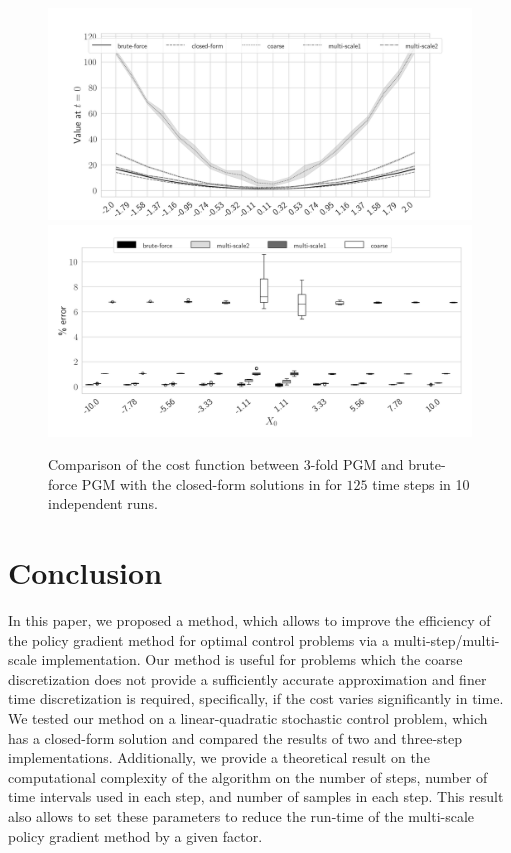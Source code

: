 \documentclass{article}
\numberwithin{equation}{section}
\begin{document}
\begin{figure}[ht!]
    \centering
    \includegraphics[width=1\linewidth]{figures/bf_100_50_5_8.png}
    \includegraphics[width=.9\linewidth]{figures/rel_100_50_5_Comparison_bf_ms2_coarse_7.png}
    \caption{Comparison of the cost function between $3$-fold PGM and brute-force PGM with the closed-form solutions in for $125$ time steps in 10 independent runs.}
    \label{fig:value2_comparison_bw_brute_multi}
\end{figure}
\section{Conclusion}
In this paper, we proposed a method, which allows to improve the efficiency of the policy gradient method for optimal control problems via a multi-step/multi-scale implementation. Our method is useful for problems which the coarse discretization does not provide a sufficiently accurate approximation and finer time discretization is required, specifically, if the cost varies significantly in time. We tested our method on a linear-quadratic stochastic control problem, which has a closed-form solution and compared the results of two and three-step implementations. Additionally, we provide a theoretical result on the computational complexity of the algorithm on the number of steps, number of time intervals used in each step, and number of samples in each step. This result also allows to set these parameters to reduce the run-time of the multi-scale policy gradient method by a given factor.
\end{document}
